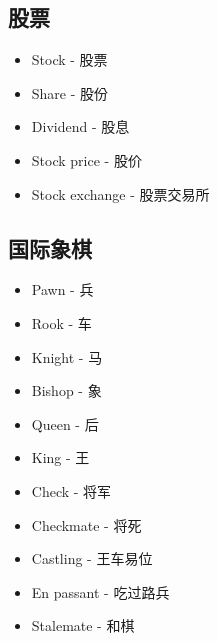\documentclass[9pt,landscape]{article}
\begin{document}
\begin{multicols}{3}
\subsection{股票}

\begin{itemize}
	\item Stock - 股票
	\item Share - 股份
	\item Dividend - 股息
	\item Stock price - 股价
	\item Stock exchange - 股票交易所
\end{itemize}

\subsection{国际象棋}
\begin{itemize}
	\item Pawn - 兵
	\item Rook - 车
	\item Knight - 马
	\item Bishop - 象
	\item Queen - 后
	\item King - 王
	\item Check - 将军
	\item Checkmate - 将死
	\item Castling - 王车易位
	\item En passant - 吃过路兵
	\item Stalemate - 和棋
\end{itemize}

\end{multicols}
\end{document}
